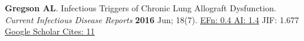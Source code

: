 \documentclass[letterpaper,10pt,sans,dvipsnames,final]{moderncv}%
\begin{document}
\begin{thebibliography}{1}
  \bibitem[7]{} \textbf{Gregson AL}. Infectious Triggers of Chronic Lung Allograft Dysfunction. {\color{BrickRed}\textit{Current Infectious Disease Reports}} \textbf{2016} Jun; 18(7). \href{http://dx.doi.org/10.1007/s11908-016-0529-6}{\aiDoi}
{\color{NavyBlue}\href{http://52.6.43.8/projects/journalRank/rankings.php?bsearch=Current+Infectious+Disease+Reports&searchby=journal&orderby=eigenfactor}{{\smaller EFn: 0.4  AI: 1.4}}
  {\smaller JIF: 1.677}~
  \href{https://scholar.google.com/scholar?oi=bibs&hl=en&cites=11018486565467933930}{{\smaller Google Scholar Cites: 11}}
       }



\end{thebibliography}
\closesection{}


\end{document}
